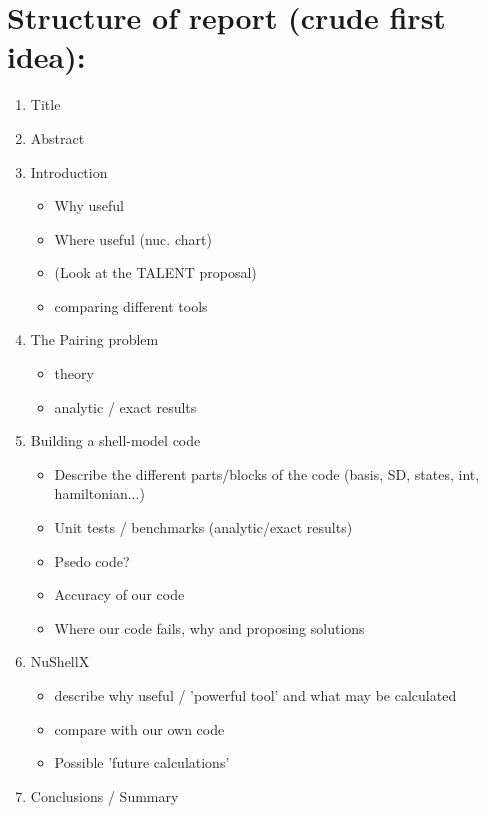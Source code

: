 \documentclass[twoside]{article}
\begin{document}




\section*{Structure of report (crude first idea):}

\begin{enumerate}
\item Title
\item Abstract
\item Introduction
\begin{itemize}
\item Why useful
\item Where useful (nuc. chart)
\item (Look at the TALENT proposal)
\item comparing different tools
\end{itemize}
\item The Pairing problem
\begin{itemize}
\item theory
\item analytic / exact results
\end{itemize}
\item Building a shell-model code
\begin{itemize}
\item Describe the different parts/blocks of the code (basis, SD, states, int, hamiltonian...)
\item Unit tests / benchmarks (analytic/exact results)
\item Psedo code?
\item Accuracy of our code
\item Where our code fails, why and proposing solutions
\end{itemize}
\item NuShellX
\begin{itemize}
\item describe why useful / 'powerful tool' and what may be calculated
\item compare with our own code
\item Possible 'future calculations'
\end{itemize}
\item Conclusions / Summary
\end{enumerate}

\end{document}
